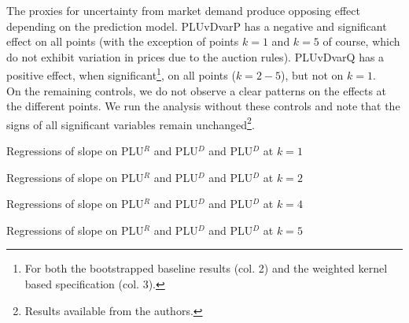 The proxies for uncertainty from market demand produce opposing effect depending on the prediction model. PLUvDvarP has a negative and significant effect on all points (with the exception of points $k=1$ and $k=5$ of course, which do not exhibit variation in prices due to the auction rules). PLUvDvarQ has a positive effect, when significant\footnote{For both the bootstrapped baseline results (col. 2) and the weighted kernel based specification (col. 3). }, on all points ($k=2-5$), but not on $k=1$. \\

On the remaining controls, we do not observe a clear patterns on the effects at the different points. We run the analysis without these controls and note that the signs of all significant variables remain unchanged\footnote{Results available from the authors.}.\\


\begin{table}[!ht]
\vspace{-2.5cm}

\vspace{-0.2cm}
\caption{\label{mainNS1_1} Regressions of slope on PLU$^R$ and PLU$^{D}$ and PLU$^{D}$ at $k=1$}
\vspace{0.9cm}

\vspace{-0.2cm}
\caption{\label{mainNS1_3} Regressions of slope on PLU$^R$ and PLU$^{D}$ and PLU$^{D}$ at $k=2$}
\end{table}
\pagestyle{empty}

\begin{table}[!ht]
\vspace{-2.5cm}

\vspace{-0.2cm}
\caption{\label{mainNS1_7} Regressions of slope on PLU$^R$ and PLU$^{D}$ and PLU$^{D}$ at $k=4$}
\vspace{0.9cm}

\vspace{-0.2cm}
\caption{\label{mainNS1_9} Regressions of slope on PLU$^R$ and PLU$^{D}$ and PLU$^{D}$ at $k=5$}
\end{table}


